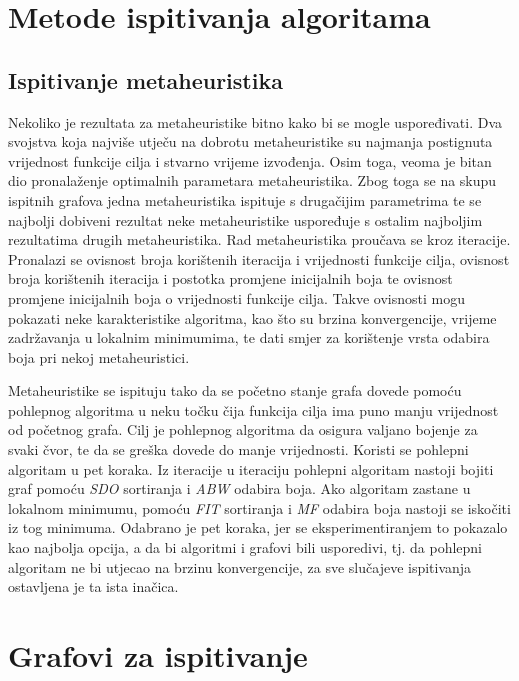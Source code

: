 \documentclass[times, utf8, diplomski, numeric]{fer}
\begin{document}
\section{Metode ispitivanja algoritama}


\subsection{Ispitivanje metaheuristika}

Nekoliko je rezultata za metaheuristike bitno kako bi se mogle uspoređivati. Dva svojstva koja najviše utječu na dobrotu metaheuristike su najmanja postignuta vrijednost funkcije cilja i stvarno vrijeme izvođenja. Osim toga, veoma je bitan dio pronalaženje optimalnih parametara metaheuristika. Zbog toga se na skupu ispitnih grafova jedna metaheuristika ispituje s drugačijim parametrima te se najbolji dobiveni rezultat neke metaheuristike uspoređuje s ostalim najboljim rezultatima drugih metaheuristika. Rad metaheuristika proučava se kroz iteracije. Pronalazi se ovisnost broja korištenih iteracija i vrijednosti funkcije cilja, ovisnost broja korištenih iteracija i postotka promjene inicijalnih boja te ovisnost promjene inicijalnih boja o vrijednosti funkcije cilja. Takve ovisnosti mogu pokazati neke karakteristike algoritma, kao što su brzina konvergencije, vrijeme zadržavanja u lokalnim minimumima, te dati smjer za korištenje vrsta odabira boja pri nekoj metaheuristici.

Metaheuristike se ispituju tako da se početno stanje grafa dovede pomoću pohlepnog algoritma u neku točku čija funkcija cilja ima puno manju vrijednost od početnog grafa. Cilj je pohlepnog algoritma da osigura valjano bojenje za svaki čvor, te da se greška dovede do manje vrijednosti. Koristi se pohlepni algoritam u pet koraka. Iz iteracije u iteraciju pohlepni algoritam nastoji bojiti graf pomoću \emph{SDO} sortiranja i \emph{ABW} odabira boja. Ako algoritam zastane u lokalnom minimumu, pomoću \emph{FIT} sortiranja i \emph{MF} odabira boja nastoji se iskočiti iz tog minimuma. Odabrano je pet koraka, jer se eksperimentiranjem to pokazalo kao najbolja opcija, a da bi algoritmi i grafovi bili usporedivi, tj. da pohlepni algoritam ne bi utjecao na brzinu konvergencije, za sve slučajeve ispitivanja ostavljena je ta ista inačica.

\section{Grafovi za ispitivanje}
\end{document}
